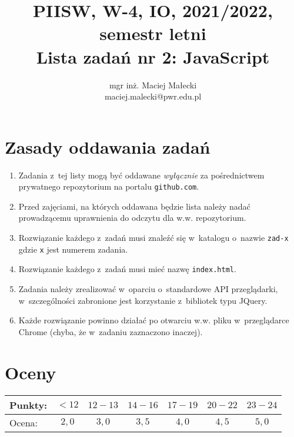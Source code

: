 \documentclass[12pt]{article}
\title{PIISW, W-4, IO, 2021/2022, semestr letni\\Lista zadań nr 2: JavaScript}
\author{mgr inż. Maciej Małecki\\\small{maciej.malecki@pwr.edu.pl}}
\begin{document}
    \maketitle

    \section*{Zasady oddawania zadań}
        \begin{enumerate}
            \item Zadania z~tej listy mogą być oddawane \emph{wyłącznie} za pośrednictwem prywatnego repozytorium na portalu \texttt{github.com}.
            \item Przed zajęciami, na których oddawana będzie lista należy nadać prowadzącemu uprawnienia do odczytu dla w.w. repozytorium.
            \item Rozwiązanie każdego z~zadań musi znaleźć się w~katalogu o~nazwie \texttt{zad-x} gdzie \texttt{x} jest numerem zadania.
            \item Rozwiązanie każdego z~zadań musi mieć nazwę \texttt{index.html}.
            \item Zadania należy zrealizować w~oparciu o~standardowe API przeglądarki, w~szczególności zabronione jest korzystanie z~bibliotek typu JQuery.
            \item Każde rozwiązanie powinno działać po otwarciu w.w. pliku w~przeglądarce Chrome (chyba, że w~zadaniu zaznaczono inaczej).
        \end{enumerate}

    \section*{Oceny}
    \begin{tabular}{|l|c|c|c|c|c|c|}
        \hline
        Punkty: & $<12$ & $12-13$ & $14-16$ & $17-19$ & $20-22$ & $23-24$\\
        \hline
        Ocena:  & $2,0$ & $3,0$ & $3,5$ & $4,0$ & $4,5$ & $5,0$\\
        \hline
    \end{tabular}
\end{document}
